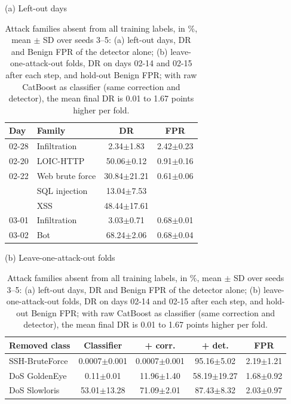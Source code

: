 \begin{table}[t]
\caption{Attack families absent from all training labels, in \%, mean $\pm$ SD over seeds 3--5: (a) left-out days, DR and Benign FPR of the detector alone; (b) leave-one-attack-out folds, DR on days 02-14 and 02-15 after each step, and hold-out Benign FPR; with raw CatBoost as classifier (same correction and detector), the mean final DR is 0.01 to 1.67 points higher per fold.}\label{tab:detectordays}\label{tab:loo}
\centering\scriptsize
\setlength{\tabcolsep}{1.5pt}
\renewcommand{\pmsd}[2]{#1$\pm$#2}
\begin{minipage}[t]{0.4\textwidth}\centering
(a) Left-out days\\[2pt]
\begin{tabular}{llcc}
\toprule
Day & Family & DR & FPR \\
\midrule
02-28 & Infiltration & \pmsd{2.34}{1.83} & \pmsd{2.42}{0.23} \\
02-20 & LOIC-HTTP & \pmsd{50.06}{0.12} & \pmsd{0.91}{0.16} \\
02-22 & Web brute force & \pmsd{30.84}{21.21} & \pmsd{0.61}{0.06} \\
 & SQL injection & \pmsd{13.04}{7.53} &  \\
 & XSS & \pmsd{48.44}{17.61} &  \\
03-01 & Infiltration & \pmsd{3.03}{0.71} & \pmsd{0.68}{0.01} \\
03-02 & Bot & \pmsd{68.24}{2.06} & \pmsd{0.68}{0.04} \\
\bottomrule
\end{tabular}
\end{minipage}\hfill
\begin{minipage}[t]{0.595\textwidth}\centering
(b) Leave-one-attack-out folds\\[2pt]
\begin{tabular}{lcccc}
\toprule
Removed class & Classifier & + corr. & + det. & FPR \\
\midrule
SSH-BruteForce & \pmsd{0.0007}{0.001} & \pmsd{0.0007}{0.001} & \pmsd{95.16}{5.02} & \pmsd{2.19}{1.21} \\
DoS GoldenEye & \pmsd{0.11}{0.01} & \pmsd{11.96}{1.40} & \pmsd{58.19}{19.27} & \pmsd{1.68}{0.92} \\
DoS Slowloris & \pmsd{53.01}{13.28} & \pmsd{71.09}{2.01} & \pmsd{87.43}{8.32} & \pmsd{2.03}{0.97} \\
\bottomrule
\end{tabular}
\end{minipage}
\end{table}
